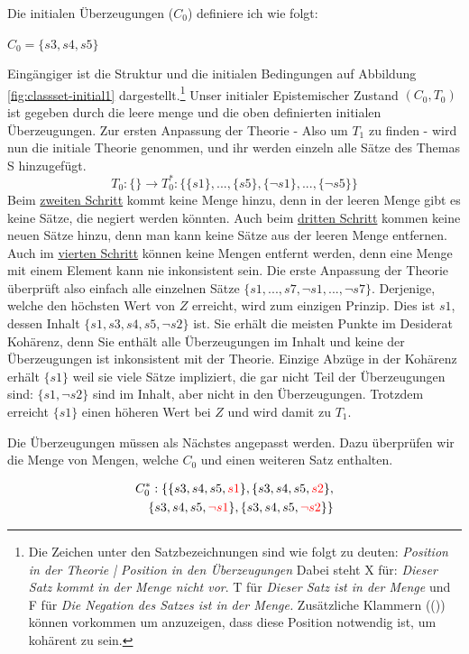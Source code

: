 \documentclass{article}
\begin{document}
 Die initialen Überzeugungen ($C_0$) definiere ich wie folgt:
 
 $C_0 = \{s3, s4, s5\}$
 
 Eingängiger ist die Struktur und die initialen Bedingungen auf Abbildung \ref{fig:classset-initial1} dargestellt.\footnote{Die Zeichen unter den Satzbezeichnungen sind wie folgt zu deuten: \textit{Position in der Theorie | Position in den Überzeugungen} Dabei steht X für: \textit{Dieser Satz kommt in der Menge nicht vor}. T für \textit{Dieser Satz ist in der Menge} und F für \textit{Die Negation des Satzes ist in der Menge.} Zusätzliche Klammern (()) können vorkommen um anzuzeigen, dass diese Position notwendig ist, um kohärent zu sein.}
 Unser initialer Epistemischer Zustand $(C_0, T_0)$ ist gegeben durch die leere menge und die oben definierten initialen Überzeugungen. Zur ersten Anpassung der Theorie - Also um $T_1$ zu finden - wird nun die initiale Theorie genommen, und ihr werden einzeln alle Sätze des Themas S hinzugefügt.
 $$
 T_0: \{\} \longrightarrow T_0^*: \{\{s1\},...,\{s5\}, \{\neg s1\}, ..., \{\neg s5\}\}
 $$
 Beim \hyperref[1.1]{zweiten Schritt} kommt keine Menge hinzu, denn in der leeren Menge gibt es keine Sätze, die negiert werden könnten. Auch beim \hyperref[2]{dritten Schritt} kommen keine neuen Sätze hinzu, denn man kann keine Sätze aus der leeren Menge entfernen. Auch im \hyperref[konsistenzfilter]{vierten Schritt} können keine Mengen entfernt werden, denn eine Menge mit einem Element kann nie inkonsistent sein. Die erste Anpassung der Theorie überprüft also einfach alle einzelnen Sätze $\{s1,...,s7, \neg s1, ..., \neg s7\}$. Derjenige, welche den höchsten Wert von $Z$ erreicht, wird zum einzigen Prinzip. Dies ist $s1$, dessen Inhalt $\{s1,s3,s4,s5,\neg s2\}$ ist. Sie erhält die meisten Punkte im Desiderat Kohärenz, denn Sie enthält alle Überzeugungen im Inhalt und keine der Überzeugungen ist inkonsistent mit der Theorie. Einzige Abzüge in der Kohärenz erhält $\{s1\}$ weil sie viele Sätze impliziert, die gar nicht Teil der Überzeugungen sind: $\{s1, \neg s2\}$ sind im Inhalt, aber nicht in den Überzeugungen. Trotzdem erreicht $\{s1\}$ einen höheren Wert bei $Z$ und wird damit zu $T_1$.
 
 Die Überzeugungen müssen als Nächstes angepasst werden. Dazu überprüfen wir die Menge von Mengen, welche $C_0$ und einen weiteren Satz enthalten.
 
 \begin{equation} \notag
 \begin{split}
 C_0^*: \{\{s3, s4, s5, \textcolor{red}{s1}\}, \{s3, s4, s5, \textcolor{red}{s2}\}, \\
 \{s3, s4, s5, \textcolor{red}{\neg s1}\}, \{s3, s4, s5, \textcolor{red}{\neg s2}\}\}
 \end{split}
 \end{equation}
 
\end{document}
